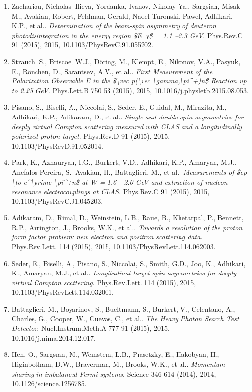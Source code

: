 \begin{enumerate}
\item Zachariou, Nicholas, Ilieva, Yordanka, Ivanov, Nikolay Ya., Sargsian, Misak M., Avakian, Robert, Feldman, Gerald, Nadel-Turonski, Pawel, Adhikari, K.P., et al.. \textit{Determination of the beam-spin asymmetry of deuteron photodisintegration in the energy region \$E\_γ\$ = 1.1 –2.3 GeV}. Phys.Rev.C 91 (2015), 2015, 10.1103/PhysRevC.91.055202.
\item Strauch, S., Briscoe, W.J., Döring, M., Klempt, E., Nikonov, V.A., Pasyuk, E., Rönchen, D., Sarantsev, A.V., et al.. \textit{First Measurement of the Polarization Observable E in the \$\textbackslash{}vec p(\textbackslash{}vec \textbackslash{}gamma,\textbackslash{}pi\textasciicircum{}+)n\$ Reaction up to 2.25 GeV}. Phys.Lett.B 750 53 (2015), 2015, 10.1016/j.physletb.2015.08.053.
\item Pisano, S., Biselli, A., Niccolai, S., Seder, E., Guidal, M., Mirazita, M., Adhikari, K.P., Adikaram, D., et al.. \textit{Single and double spin asymmetries for deeply virtual Compton scattering measured with CLAS and a longitudinally polarized proton target}. Phys.Rev.D 91 (2015), 2015, 10.1103/PhysRevD.91.052014.
\item Park, K., Aznauryan, I.G., Burkert, V.D., Adhikari, K.P., Amaryan, M.J., Anefalos Pereira, S., Avakian, H., Battaglieri, M., et al.. \textit{Measurements of \$ep \textbackslash{}to e\textasciicircum{}\textbackslash{}prime \textbackslash{}pi\textasciicircum{}+n\$ at W = 1.6 - 2.0 GeV and extraction of nucleon resonance electrocouplings at CLAS}. Phys.Rev.C 91 (2015), 2015, 10.1103/PhysRevC.91.045203.
\item Adikaram, D., Rimal, D., Weinstein, L.B., Raue, B., Khetarpal, P., Bennett, R.P., Arrington, J., Brooks, W.K., et al.. \textit{Towards a resolution of the proton form factor problem: new electron and positron scattering data}. Phys.Rev.Lett. 114 (2015), 2015, 10.1103/PhysRevLett.114.062003.
\item Seder, E., Biselli, A., Pisano, S., Niccolai, S., Smith, G.D., Joo, K., Adhikari, K., Amaryan, M.J., et al.. \textit{Longitudinal target-spin asymmetries for deeply virtual Compton scattering}. Phys.Rev.Lett. 114 (2015), 2015, 10.1103/PhysRevLett.114.032001.
\item Battaglieri, M., Boyarinov, S., Bueltmann, S., Burkert, V., Celentano, A., Charles, G., Cooper, W., Cuevas, C., et al.. \textit{The Heavy Photon Search Test Detector}. Nucl.Instrum.Meth.A 777 91 (2015), 2015, 10.1016/j.nima.2014.12.017.
\item Hen, O., Sargsian, M., Weinstein, L.B., Piasetzky, E., Hakobyan, H., Higinbotham, D.W., Braverman, M., Brooks, W.K., et al.. \textit{Momentum sharing in imbalanced Fermi systems}. Science 346 614 (2014), 2014, 10.1126/science.1256785.

\end{enumerate}
